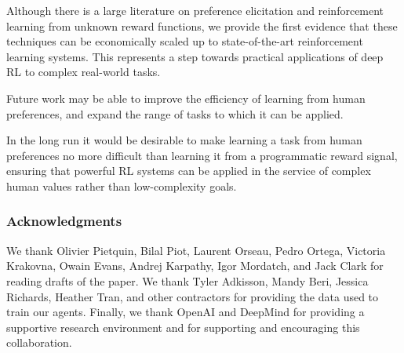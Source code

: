 Although there is a large literature on preference elicitation and reinforcement learning from unknown reward functions, we provide the first evidence that these techniques can be economically scaled up to state-of-the-art reinforcement learning systems. This represents a step towards practical applications of deep RL to complex real-world tasks.

Future work may be able to improve the efficiency of learning from human preferences, and expand the range of tasks to which it can be applied.

In the long run it would be desirable to make learning a task from human preferences no more difficult than learning it from a programmatic reward signal, ensuring that powerful RL systems can be applied in the service of complex human values rather than low-complexity goals.

\subsubsection*{Acknowledgments}
We thank Olivier Pietquin, Bilal Piot, Laurent Orseau, Pedro Ortega, Victoria Krakovna, Owain Evans, Andrej Karpathy, Igor Mordatch, and Jack Clark for reading drafts of the paper. We thank Tyler Adkisson, Mandy Beri, Jessica Richards, Heather Tran, and other contractors for providing the data used to train our agents. Finally, we thank OpenAI and DeepMind for providing a supportive research environment and for supporting and encouraging this collaboration.



